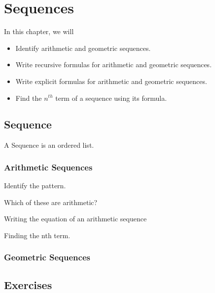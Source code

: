 
\chapter{Sequences}

\begin{summary}
In this chapter, we will 
\begin{itemize}
    \item Identify arithmetic and geometric sequences.
    \item Write recursive formulas for arithmetic and geometric sequences. 
    \item Write explicit formulas for arithmetic and geometric sequences.
    \item Find the \(n^{th}\) term of a sequence using its formula. 
\end{itemize}
\end{summary}


\newpage 
\section{Sequence}

A Sequence is an ordered list.  

\subsection{Arithmetic Sequences}

Identify the pattern.  

Which of these are arithmetic?  

Writing the equation of an arithmetic sequence

Finding the nth term.  


\subsection{Geometric Sequences} 

\newpage 
\section{Exercises} 